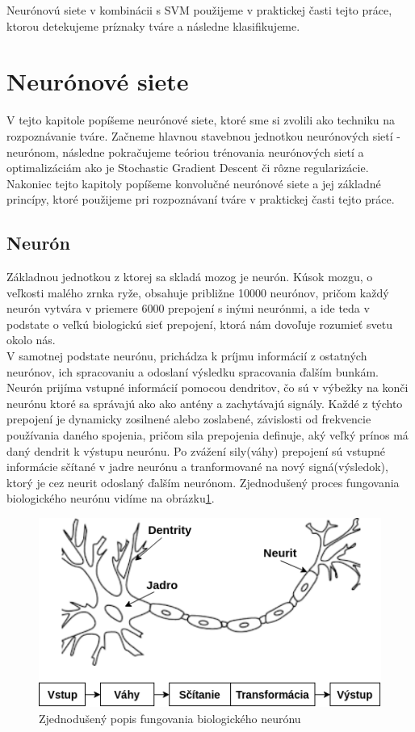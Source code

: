 \indent Neurónovú siete v kombinácii s SVM použijeme v praktickej časti tejto práce, ktorou detekujeme príznaky tváre a následne klasifikujeme.

\newpage 

\section{Neurónové siete}\label{l:nns}
V tejto kapitole popíšeme neurónové siete, ktoré sme si zvolili ako techniku na rozpoznávanie tváre.
Začneme hlavnou stavebnou jednotkou neurónových sietí - neurónom, následne pokračujeme teóriou trénovania neurónových sietí a optimalizáciám
ako je Stochastic Gradient Descent či rôzne regularizácie.
Nakoniec tejto kapitoly popíšeme konvolučné neurónové siete a jej základné princípy, ktoré použijeme pri rozpoznávaní tváre v praktickej časti tejto práce.

\subsection{Neurón}
Základnou jednotkou z ktorej sa skladá mozog je neurón.
Kúsok mozgu, o veľkosti malého zrnka ryže, obsahuje približne 10000 neurónov, pričom každý neurón
vytvára v priemere 6000 prepojení s inými neurónmi, a ide teda v podstate o
veľkú biologickú sieť prepojení, ktorá nám dovoľuje rozumieť svetu okolo nás\cite{buduma2017fundamentals}. \\
\indent V samotnej podstate neurónu, prichádza k príjmu informácií z ostatných neurónov, 
ich spracovaniu a odoslaní výsledku spracovania ďalším bunkám.
Neurón prijíma vstupné informácií pomocou dendritov, čo sú v výbežky na konči neurónu ktoré sa správajú ako 
ako antény a zachytávajú signály.
Každé z týchto prepojení je dynamicky zosilnené alebo zoslabené, závislosti od frekvencie používania daného spojenia, pričom sila prepojenia definuje, aký veľký prínos má daný dendrit k výstupu neurónu\cite{buduma2017fundamentals}.
Po zvážení sily(váhy) prepojení sú vstupné informácie sčítané v jadre neurónu a tranformované na 
nový signá(výsledok), ktorý je cez neurit odoslaný ďalším neurónom.
Zjednodušený proces fungovania biologického neurónu vidíme na obrázku\ref{fig:bioneuron}.

\begin{figure}[H]
	\centering
	\includegraphics[width=0.5\linewidth]{img/bioneuron}
	\caption{Zjednodušený popis fungovania biologického neurónu}
	\label{fig:bioneuron}
\end{figure}

